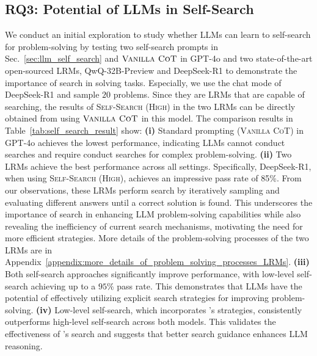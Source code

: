 \subsection{RQ3: Potential of LLMs in Self-Search}
\label{sec:experiment_self_search}
We conduct an initial exploration to study whether LLMs can learn to self-search for problem-solving by testing two self-search prompts in Sec.~\ref{sec:llm_self_search} and $\textsc{Vanilla CoT}$ in GPT-4o and two state-of-the-art open-sourced LRMs, QwQ-32B-Preview and DeepSeek-R1 to demonstrate the importance of search in solving tasks. Especially, we use the chat mode of DeepSeek-R1 and sample $20$ problems.
Since they are LRMs that are capable of searching, the results of \textsc{Self-Search (High)} in the two LRMs can be directly obtained from using $\textsc{Vanilla CoT}$ in this model.
The comparison results in Table~\ref{tab:self_search_result} show: 
\textbf{(i)} Standard prompting (\textsc{Vanilla CoT}) in GPT-4o achieves the lowest performance, indicating LLMs cannot conduct searches and require conduct searches for complex problem-solving.
{\textbf{(ii)} Two LRMs achieve the best performance across all settings. Specifically, DeepSeek-R1, when using \textsc{Self-Search (High)}, achieves an impressive pass rate of \num{85}\%. From our observations, these LRMs perform search by iteratively sampling and evaluating different answers until a correct solution is found. This underscores the importance of search in enhancing LLM problem-solving capabilities while also revealing the inefficiency of current search mechanisms, motivating the need for more efficient strategies. More details of the problem-solving processes of the two LRMs are in Appendix~\ref{appendix:more_details_of_problem_solving_processes_LRMs}.}
\textbf{(iii)} Both self-search approaches significantly improve performance, with low-level self-search achieving up to a $95\%$ pass rate. This demonstrates that LLMs have the potential of effectively utilizing explicit search strategies for improving problem-solving.
\textbf{(iv)} Low-level self-search, which incorporates \method's strategies, consistently outperforms high-level self-search across both models. This validates the effectiveness of \method's search and suggests that better search guidance enhances LLM reasoning. 
